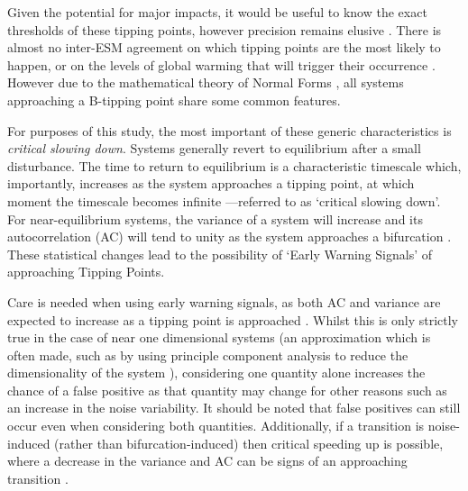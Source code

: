 Given the potential for major impacts, it would be useful to know the exact thresholds of
these tipping points, however precision remains elusive \parencite{Steffen2018}.
There is almost no inter-ESM
agreement on which tipping points are the most likely to happen, or on the
levels of global warming that will trigger their
occurrence \parencite{Drijfhout2015}.
However due to the mathematical theory of Normal 
Forms \parencite{Strogatz2015,guckenheimer2013}, all systems approaching a
B-tipping point share some common features.

For purposes of this study, the most important of these generic characteristics
is \emph{critical slowing down}. Systems generally revert to  equilibrium after a small disturbance. 
The time to return to equilibrium is a characteristic timescale which, importantly, increases as the system 
approaches a tipping point, at which moment the timescale becomes 
infinite \parencite{Scheffer2012}---referred to as `critical slowing down'. 
For near-equilibrium systems, the variance of a system will increase and its autocorrelation (AC)
will tend to unity as the system approaches a bifurcation \parencite{Scheffer2009,Held2004}.
These statistical changes lead to the possibility of `Early Warning Signals' of approaching Tipping Points.

Care is needed when using early warning signals, as
both AC and variance are expected to increase as a tipping point is 
approached \parencite{Ditlevsen2010}. Whilst this is only strictly true
in the case of near one dimensional systems (an approximation which is often made, such as by using principle component analysis to reduce the 
dimensionality of the system \parencite{Held2004}), considering one quantity alone 
increases the chance of a false positive as that quantity may change for other reasons such as an increase in the noise variability. It should 
be noted that false positives can still occur even when considering 
both quantities.
Additionally, if a transition is noise-induced (rather than bifurcation-induced) then critical speeding up is possible, where
a decrease in the variance and AC can be signs of an approaching transition \parencite{Titus2020}.

